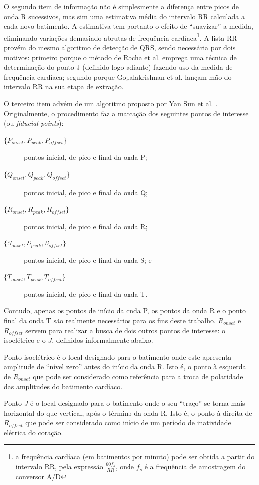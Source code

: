 O segundo item de informação não é simplesmente a diferença entre picos de onda R sucessivos, mas sim uma estimativa média do intervalo RR calculada a cada novo batimento. A estimativa tem portanto o efeito de ``suavizar'' a medida, eliminando variações demasiado abrutas de frequência cardíaca\footnote{a frequência cardíaca (em batimentos por minuto) pode ser obtida a partir do intervalo RR, pela expressão $\frac{60f_s}{RR}$, onde $f_s$ é a frequência de amostragem do conversor A/D}. A lista RR provém do mesmo algoritmo de detecção de QRS, sendo necessária por dois motivos: primeiro porque o método de Rocha et al. emprega uma técnica de determinação do ponto J (definido logo adiante) fazendo uso da medida de frequência cardíaca; segundo porque Gopalakrishnan et al. lançam mão do intervalo RR na sua etapa de extração.

O terceiro item advém de um algoritmo proposto por Yan Sun et al. \cite{Sun2005}. Originalmente, o procedimento faz a marcação dos seguintes pontos de interesse (ou \emph{fiducial points}):
\begin{description}
    \item[$\{P_{onset}, P_{peak}, P_{offset}\}$] pontos inicial, de pico e final da onda P;
    \item[$\{Q_{onset}, Q_{peak}, Q_{offset}\}$] pontos inicial, de pico e final da onda Q;
    \item[$\{R_{onset}, R_{peak}, R_{offset}\}$] pontos inicial, de pico e final da onda R;
    \item[$\{S_{onset}, S_{peak}, S_{offset}\}$] pontos inicial, de pico e final da onda S; e
    \item[$\{T_{onset}, T_{peak}, T_{offset}\}$] pontos inicial, de pico e final da onda T.
\end{description}
Contudo, apenas os pontos de início da onda P, os pontos da onda R e o ponto final da onda T são realmente necessários para os fins deste trabalho. $R_{onset}$ e $R_{offset}$ servem para realizar a busca de dois outros pontos de interesse: o isoelétrico e o $J$, definidos informalmente abaixo.
\begin{mydef}
    Ponto isoelétrico é o local designado para o batimento onde este apresenta amplitude de ``nível zero'' antes do início da onda R. Isto é, o ponto à esquerda de $R_{onset}$ que pode ser considerado como referência para a troca de polaridade das amplitudes do batimento cardíaco.
\end{mydef}
\begin{mydef}
    Ponto $J$ é o local designado para o batimento onde o seu ``traço'' se torna mais horizontal do que vertical, após o término da onda R. Isto é, o ponto à direita de $R_{offset}$ que pode ser considerado como início de um período de inatividade elétrica do coração.
\end{mydef}

